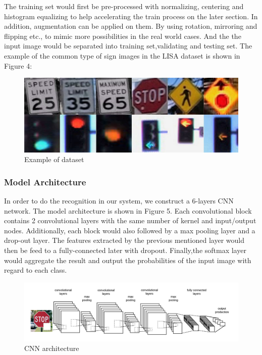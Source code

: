\documentclass[conference]{IEEEtran}
\begin{document}
The training set would first be pre-processed with normalizing, centering and histogram equalizing to help accelerating the train process on the later section. In addition, augmentation can be applied on them. By using rotation, mirroring and flipping etc., to mimic more possibilities in the real world cases. And the the input image would be separated into training set,validating  and testing set. The example of the common type of sign images in the LISA dataset is shown in Figure 4:

\begin{figure}[hb]
\centering
  \begin{minipage}{.4\textwidth}
    \centering
    \includegraphics[width=0.8\linewidth]{dataset3.jpg}
    \caption{Example of dataset}
    \label{fig:fig_1}
  \end{minipage}
\end{figure}

\subsubsection{Model Architecture}
In order to do the recognition in our system, we construct a 6-layers CNN network. The model architecture is shown in Figure 5. Each convolutional block contains 2 convolutional layers with the same number of kernel and input/output nodes. Additionally, each block would also followed by a max pooling layer and a drop-out layer. The features extracted by the previous mentioned layer would then be feed to a fully-connected later with dropout. Finally,the softmax layer would aggregate the result and output the probabilities of the input image with regard to each class.

\begin{figure}[H]
\centering
  \begin{minipage}{.5\textwidth}
    \centering
    \includegraphics[width=0.8\linewidth]{convolutional_layer.png}
    \caption{CNN architecture}
    \label{fig:fig_1}
  \end{minipage}
\end{figure}
\end{document}
